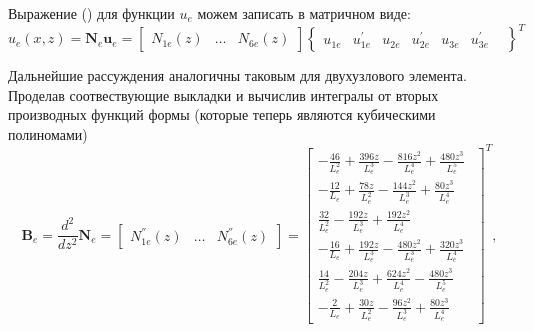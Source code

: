 \documentclass[12pt,a4paper]{article}
\begin{document}
Выражение () для функции $u_{e}$ можем записать в матричном виде:
\[
	u_e(x,z)=\textbf{N}_e \textbf{u}_{e}=
	\left[
	\begin{array}{ccc}
		N_{1e}(z) & \ldots & N_{6e}(z)
	\end{array}
	\right]
	\left\{
	\begin{array}{ccccccc}
		u_{1e}  &
		u^{'}_{1e}  &
		u_{2e} &
		u^{'}_{2e} &
		u_{3e} &
		u^{'}_{3e} &
	\end{array}
	\right\}^T
\]

Дальнейшие рассуждения аналогичны таковым для двухузлового элемента. Проделав соотвествующие выкладки и вычислив интегралы от вторых производных функций формы (которые теперь являются кубическими полиномами)
%
%
%
%
\begin{equation*}
\textbf{B}_e=\frac{d^{2}}{dz^{2}}\textbf{N}_e=
\left[
  \begin{array}{cccccc}
     N_{1e}^{''}(z) & \ldots & N_{6e}^{''}(z)
  \end{array}
\right]=
\begin{bmatrix}
-\frac{46}{L_e^{2}}+\frac{396z}{L_e^{3}}-\frac{816z^{2}}{L_e^{4}}+\frac{480z^{3}}{L_e^{5}}  ~~ \\
  -\frac{12}{L_e}+\frac{78z}{L_e^{2}}-\frac{144z^{2}}{L_e^{3}}+\frac{80z^{3}}{L_e^{4}} ~~\\
 \frac{32}{L_e^{2}}-\frac{192z}{L_e^{3}}+\frac{192z^{2}}{L_e^{4}}~~ \\
 -\frac{16}{L_e}+\frac{192z}{L_e^{3}}-\frac{480z^{2}}{L_e^{3}}+\frac{320z^{3}}{L_e^{4}}~~ \\
 \frac{14}{L_e^{2}}-\frac{204z}{L_e^{3}}+\frac{624z^{2}}{L_e^{4}}-\frac{480z^{3}}{L_e^{5}}~~\\
 -\frac{2}{L_e}+\frac{30z}{L_e^{2}}-\frac{96z^{2}}{L_e^{3}}+\frac{80z^{3}}{L_e^{4}}
\end{bmatrix}^T,
\end{equation*}
\end{document}
